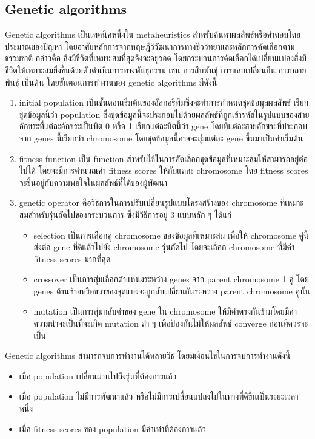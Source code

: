 \subsection{Genetic algorithms}
Genetic algorithms เป็นเทคนิคหนึ่งใน metaheuristics สำหรับค้นหาผลลัพธ์หรือคำตอบโดยประมาณของปัญหา โดยอาศัยหลักการจากทฤษฎีวิวัฒนาการทางชีววิทยาและหลักการคัดเลือกตามธรรมชาติ  กล่าวคือ สิ่งมีชีวิตที่เหมาะสมที่สุดจึงจะอยู่รอด \cite{ga} โดยกระบวนการคัดเลือกได้เปลี่ยนแปลงสิ่งมีชีวิตให้เหมาะสมยิ่งขึ้นด้วยตัวดำเนินการทางพันธุกรรม เช่น การสืบพันธุ์ การแลกเปลี่ยนยีน การกลายพันธุ์ เป็นต้น โดยขั้นตอนการทำงานของ genetic algorithms มีดังนี้ 
\begin{enumerate}
  \item initial population เป็นขั้นตอนเริ่มต้นของอัลกอริทึมซึ่งจะทำการกำหนดชุดข้อมูลผลลัพธ์ เรียกชุดข้อมูลนี้ว่า population ซึ่งชุดข้อมูลนี้จะประกอบไปด้วยผลลัพธ์ที่ถูกเข้ารหัสในรูปแบบของสายอักขระที่แต่ละอักขระเป็นบิต 0 หรือ 1 เรียกแต่ละบิตนี้ว่า gene
  โดยที่แต่ละสายอักขระที่ประกอบจาก genes นี้เรียกว่า chromosome โดยชุดข้อมูลนี้อาจจะสุ่มแต่ละ gene ขึ้นมาเป็นค่าเริ่มต้น
  \item fitness function เป็น function สำหรับใช้ในการคัดเลือกชุดข้อมูลที่เหมาะสมให้สามารถอยู่ต่อไปได้ โดยจะมีการคำนวณค่า fitness scores ให้กับแต่ละ chromosome
  โดย fitness scores จะขึ้นอยู่กับความพอใจในผลลัพธ์ที่ได้ของผู้พัฒนา
  \item genetic operator คือวิธีการในการปรับเปลี่ยนรูปแบบโครงสร้างของ chromosome ที่เหมาะสมสำหรับรุ่นถัดไปของกระบวนการ ซึ่งมีวิธีการอยู่ 3 แบบหลัก ๆ ได้แก่
  \begin{itemize}
  \item selection เป็นการเลือกคู่ chromosome ของข้อมูลที่เหมาะสม เพื่อให้ chromosome คู่นี้ส่งต่อ gene ที่ดีแล้วไปยัง chromosome รุ่นถัดไป โดยจะเลือก chromosome ที่มีค่า fitness scores มากที่สุด
  \item crossover เป็นการสุ่มเลือกตำแหน่งระหว่าง genes จาก parent chromosome 1 คู่ โดย genes ด้านซ้ายหรือขวาของจุดแบ่งจะถูกสับเปลี่ยนกันระหว่าง parent chromosome คู่นั้น
  \item mutation เป็นการสุ่มกลับค่าของ gene ใน chromosome ให้มีค่าตรงกันข้ามโดยมีค่าความน่าจะเป็นที่จะเกิด mutation ต่ำ ๆ เพื่อป้องกันไม่ให้ผลลัพธ์ converge ก่อนที่ควรจะเป็น
\end{itemize}
\end{enumerate}
Genetic algorithms สามารถจบการทำงานได้หลายวิธี โดยมีเงื่อนไขในการจบการทำงานดังนี้
\begin{itemize}
  \item เมื่อ population เปลี่ยนผ่านไปถึงรุ่นที่ต้องการแล้ว 
  \item เมื่อ population ไม่มีการพัฒนาแล้ว หรือไม่มีการเปลี่ยนแปลงไปในทางที่ดีขึ้นเป็นระยะเวลาหนึ่ง
  \item เมื่อ fitness scores ของ population มีค่าเท่าที่ต้องการแล้ว
\end{itemize}

